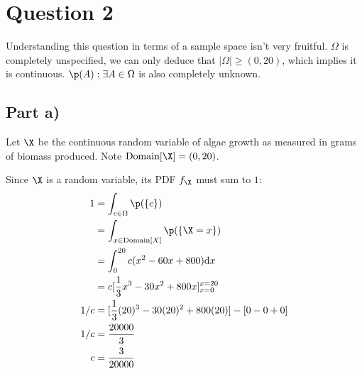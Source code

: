 \vspace{0.5cm}

\section{Question 2}

Understanding this question in terms of a sample space isn't very fruitful.
$\Omega$ is completely unspecified, we can only deduce that $|\Omega| \geq (0, 20)$, which implies it is continuous.
$\p (A) : \exists A \in \Omega$ is also completely unknown.

\subsection{Part a)}

Let $\X$ be the continuous random variable of algae growth as measured in grams of biomass produced.
Note $\mathrm{Domain}[\X] = (0, 20)$.

Since $\X$ is a random variable, its PDF $f_{\X}$ must sum to $1$:
\begin{align}
1 &= \int _{c \in \Omega} \p (\{ c \}) \\
&= \int _{x \in \mathrm{Domain}[X]} \p(\{ \X = x \}) \\
&= \int _0 ^{20} c(x^2 - 60x + 800) \mathrm{d}x \\
&= c[\frac{1}{3}x^3 - 30x^2 + 800x]_{x = 0}^{x=20} \\
1/c &= [\frac{1}{3}(20)^3 - 30(20)^2 + 800(20)] - [0 - 0 + 0] \\
1/c &= \frac{20000}{3} \\
c &= \frac{3}{20000}
\end{align}
